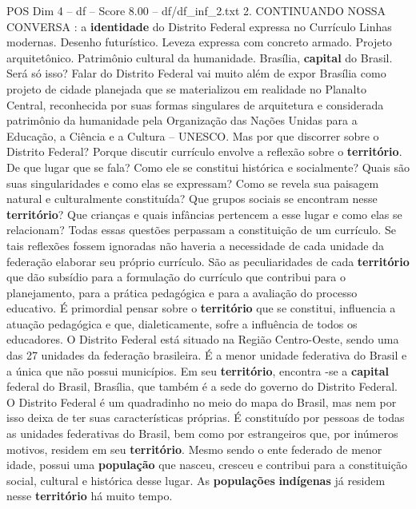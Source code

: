 \begin{textsample}{POS Dim 4 – df – Score 8.00 – df/df\_inf\_2.txt}  \label{ex:f4_pos_227}
2.
CONTINUANDO NOSSA CONVERSA : a \textbf{identidade} do Distrito Federal expressa no Currículo Linhas modernas.
Desenho futurístico.
Leveza expressa com concreto armado.
Projeto arquitetônico.
Patrimônio cultural da humanidade.
Brasília, \textbf{capital} do Brasil.
Será só isso?
Falar do Distrito Federal vai muito além de expor Brasília como projeto de cidade planejada que se materializou em realidade no Planalto Central, reconhecida por suas formas singulares de arquitetura e considerada patrimônio da humanidade pela Organização das Nações Unidas para a Educação, a Ciência e a Cultura – UNESCO.
Mas por que discorrer sobre o Distrito Federal?
Porque discutir currículo envolve a reflexão sobre o \textbf{território}.
De que lugar que se fala?
Como ele se constitui histórica e socialmente?
Quais são suas singularidades e como elas se expressam?
Como se revela sua paisagem natural e culturalmente constituída?
Que grupos sociais se encontram nesse \textbf{território}?
Que crianças e quais infâncias pertencem a esse lugar e como elas se relacionam?
Todas essas questões perpassam a constituição de um currículo.
Se tais reflexões fossem ignoradas não haveria a necessidade de cada unidade da federação elaborar seu próprio currículo.
São as peculiaridades de cada \textbf{território} que dão subsídio para a formulação do currículo que contribui para o planejamento, para a prática pedagógica e para a avaliação do processo educativo.
É primordial pensar sobre o \textbf{território} que se constitui, influencia a atuação pedagógica e que, dialeticamente, sofre a influência de todos os educadores.
O Distrito Federal está situado na Região Centro-Oeste, sendo uma das 27 unidades da federação brasileira.
É a menor unidade federativa do Brasil e a única que não possui municípios.
Em seu \textbf{território}, encontra -se a \textbf{capital} federal do Brasil, Brasília, que também é a sede do governo do Distrito Federal.
O Distrito Federal é um quadradinho no meio do mapa do Brasil, mas nem por isso deixa de ter suas características próprias.
É constituído por pessoas de todas as unidades federativas do Brasil, bem como por estrangeiros que, por inúmeros motivos, residem em seu \textbf{território}.
Mesmo sendo o ente federado de menor idade, possui uma \textbf{população} que nasceu, cresceu e contribui para a constituição social, cultural e histórica desse lugar.
As \textbf{populações} \textbf{indígenas} já residem nesse \textbf{território} há muito tempo.

\end{textsample}
